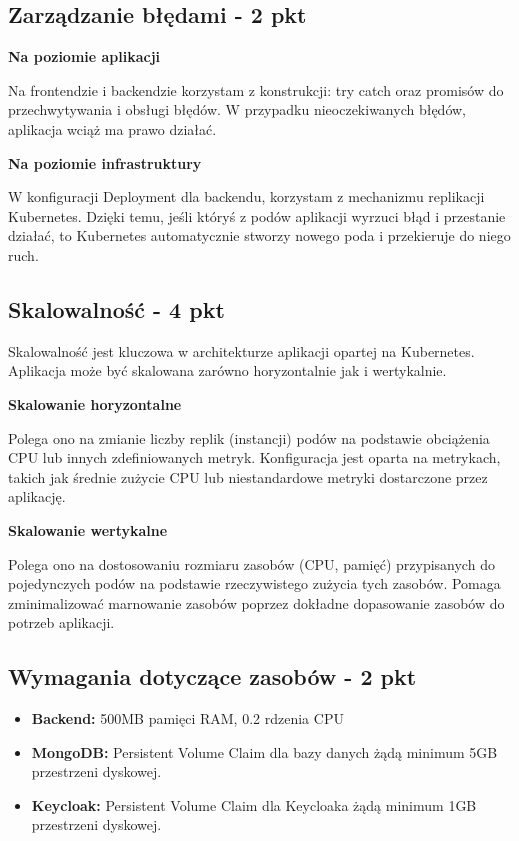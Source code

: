 \documentclass[12pt,a4paper]{article}
\begin{document}
\subsection{Zarządzanie błędami - 2 pkt}
\label{sec:ERD} 

{\noindent\medium\textbf{Na poziomie aplikacji}}

Na frontendzie i backendzie korzystam z konstrukcji: try catch oraz promisów do przechwytywania i obsługi błędów. W przypadku nieoczekiwanych błędów, aplikacja wciąż ma prawo działać.

{\noindent\medium\textbf{Na poziomie infrastruktury}}

W konfiguracji Deployment dla backendu, korzystam z mechanizmu replikacji Kubernetes. Dzięki temu, jeśli któryś z podów aplikacji wyrzuci błąd i przestanie działać, to Kubernetes automatycznie stworzy nowego poda i przekieruje do niego ruch.



\subsection{Skalowalność - 4 pkt}
\label{sec:ExamplesSection}

\noindent Skalowalność jest kluczowa w architekturze aplikacji opartej na Kubernetes. 
Aplikacja może być skalowana zarówno horyzontalnie jak i wertykalnie.

{\noindent\medium\textbf{Skalowanie horyzontalne}}

Polega ono na zmianie liczby replik (instancji) podów na podstawie obciążenia CPU lub innych zdefiniowanych metryk. Konfiguracja jest oparta na metrykach, takich jak średnie zużycie CPU lub niestandardowe metryki dostarczone przez aplikację.

{\noindent\medium\textbf{Skalowanie wertykalne}}

Polega ono na dostosowaniu rozmiaru zasobów (CPU, pamięć) przypisanych do pojedynczych podów na podstawie rzeczywistego zużycia tych zasobów. Pomaga zminimalizować marnowanie zasobów poprzez dokładne dopasowanie zasobów do potrzeb aplikacji.

\subsection{Wymagania dotyczące zasobów - 2 pkt}
\label{sec:ExampleTables}

\begin{itemize}
\item \textbf{Backend:} 500MB pamięci RAM, 0.2 rdzenia CPU

\item \textbf{MongoDB:} Persistent Volume Claim dla bazy danych żądą minimum 5GB przestrzeni dyskowej.

\item \textbf{Keycloak:} Persistent Volume Claim dla Keycloaka żądą minimum 1GB przestrzeni dyskowej.

\end{itemize}
\end{document}
